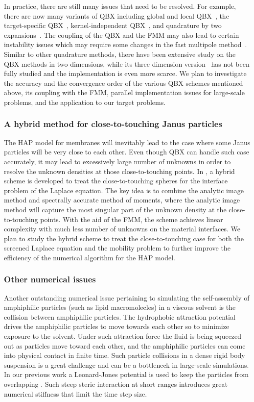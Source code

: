 In practice, there are still many issues that need to be resolved.
For example, there are now many variants of QBX including global and local
QBX~\cite{klockner2013jcp,rachh2017jcp}, the target-specific QBX~\cite{siegel2018jcp},
kernel-independent QBX~\cite{abtin2018bit}, and
quadrature by two expansions~\cite{ding2019arxiv}. The coupling of the QBX
and the FMM may also lead to certain instability issues which may require
some changes in the fast multipole method~\cite{wala2018jcp}. Similar
to other quadrature methods, there have been extensive study on the QBX
methods in two dimensions, while its three dimension
version~\cite{wala2019jcp,af2018sisc,siegel2018jcp,wala2019arxiv} has not been
fully studied and the implementation is even more scarce. We plan to investigate
the accuracy and the convergence order of the various QBX schemes mentioned above,
its coupling with the FMM, parallel implementation issues for large-scale
problems, and the application to our target problems.
\subsubsection{A hybrid method for close-to-touching Janus particles}
The HAP model for membranes will inevitably lead to the case where some Janus particles
will be very close to each other. Even though QBX can handle such case
accurately, it may lead to excessively large number of unknowns in order to resolve
the unknown densities at those close-to-touching points. In \cite{gan2016sisc},
a hybrid scheme is developed to treat the close-to-touching spheres for the interface
problem of the Laplace equation. The key idea is to combine the analytic image method
and spectrally accurate method of moments, where the analytic image method will capture
the most singular part of the unknown density at the close-to-touching points.
With the aid of the FMM, the scheme achieves linear complexity with much less number
of unknowns on the material interfaces.
We plan to study the hybrid scheme
to treat the close-to-touching case for both the screened Laplace equation and the
mobility problem to further improve the efficiency of the numerical algorithm
for the HAP model.
\subsubsection{Other numerical issues}
Another outstanding numerical issue pertaining to simulating the self-assembly of amphiphilic particles (such as lipid macromolecles) in a
viscous solvent is the collision between amphiphilic particles.
The hydrophobic attraction potential drives the amphiphilic particles to move towards each other so to minimize exposure to the solvent. 
Under such
attraction force the fluid is being squeezed out as particles move toward each other, and the amphiphilic particles can come into physical
contact in finite time. 
Such particle collisions in a dense rigid body suspension is a great challenge and can be a bottleneck in large-scale simulations. 
In our previous work a Leonard-Jones potential is used to keep the particles from overlapping \cite{Fu19}. 
Such steep steric interaction at
short ranges introduces great numerical stiffness that limit the time step size. 

